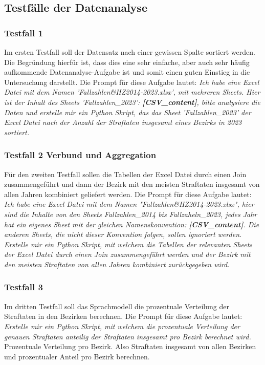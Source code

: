 \documentclass[11pt,a4paper]{article}
\begin{document}
\subsection{Testfälle der Datenanalyse}
\label{sec:testfaelle}
\subsubsection{Testfall 1}
    Im ersten Testfall soll der Datensatz nach einer gewissen Spalte sortiert werden. Die Begründung hierfür ist, dass dies eine sehr einfache, aber auch sehr häufig aufkommende Datenanalyse-Aufgabe ist und somit einen guten Einstieg in die Untersuchung darstellt. Die Prompt für diese Aufgabe lautet: \emph{Ich habe eine Excel Datei mit dem Namen 'Fallzahlen\&HZ2014-2023.xlsx', mit mehreren Sheets. Hier ist der Inhalt des Sheets 'Fallzahlen\_2023': \textbf{[CSV\_content]}, bitte analysiere die Daten und erstelle mir ein Python Skript, das das Sheet 'Fallzahlen\_2023' der Excel Datei nach der Anzahl der Straftaten insgesamt eines Bezirks in 2023 sortiert.}

\subsubsection{Testfall 2 Verbund und Aggregation}
    Für den zweiten Testfall sollen die Tabellen der Excel Datei durch einen Join zusammengeführt und dann der Bezirk mit den meisten Straftaten insgesamt von allen Jahren kombiniert geliefert werden. Die Prompt für diese Aufgabe lautet: \emph{Ich habe eine Execl Datei mit dem Namen "Fallzahlen\&HZ2014-2023.xlsx", hier sind die Inhalte von den Sheets Fallzahlen\_2014 bis Fallzaheln\_2023, jedes Jahr hat ein eigenes Sheet mit der gleichen Namenskonvention: \textbf{[CSV\_content]}. Die anderen Sheets, die nicht dieser Konvention folgen, sollen ignoriert werden. Erstelle mir ein Python Skript, mit welchem die Tabellen der relevanten Sheets der Excel Datei durch einen Join zusammengeführt werden und der Bezirk mit den meisten Straftaten von allen Jahren kombiniert zurückgegeben wird.}

\subsubsection{Testfall 3}
    Im dritten Testfall soll das Sprachmodell die prozentuale Verteilung der Straftaten in den Bezirken berechnen. Die Prompt für diese Aufgabe lautet: \emph{Erstelle mir ein Python Skript, mit welchem die prozentuale Verteilung der genauen Straftaten anteilig der Straftaten insgesamt pro Bezirk berechnet wird.}
    Prozentuale Verteilung pro Bezirk. Also Straftaten insgesamt von allen Bezirken und prozentualer Anteil pro Bezirk berechnen.
\end{document}
